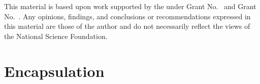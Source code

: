 \documentclass[acmsmall,review,anonymous]{acmart}\settopmatter{printfolios=true,printccs=false,printacmref=false}
\begin{document}
%


\begin{acks}                            %
  This material is based upon work supported by the
   under Grant
  No.~ and Grant
  No.~.  Any opinions, findings, and
  conclusions or recommendations expressed in this material are those
  of the author and do not necessarily reflect the views of the
  National Science Foundation.
\end{acks}




\clearpage

\appendix
\appendix


\section{Encapsulation}

\end{document}

